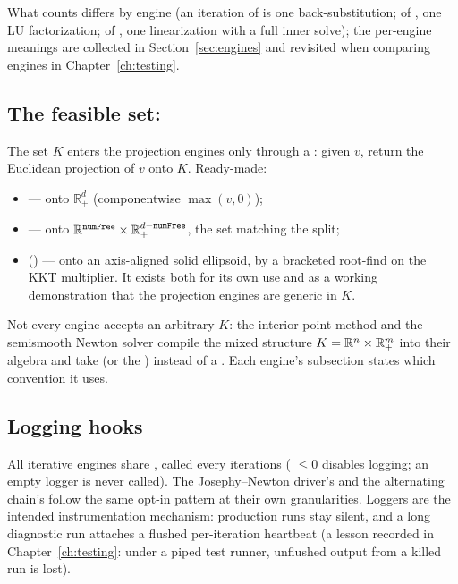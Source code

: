 What  counts differs by engine (an iteration of  is
one back-substitution; of , one LU factorization; of
, one linearization with a full inner solve); the per-engine
meanings are collected in Section~\ref{sec:engines} and revisited when
comparing engines in Chapter~\ref{ch:testing}.

\subsection{The feasible set: }

The set $K$ enters the projection engines only through a
: given $v$, return
the Euclidean projection of $v$ onto $K$. Ready-made:

\begin{itemize}
\item {} --- onto $\mathbb{R}^{d}_{+}$
  (componentwise $\max(v, 0)$);
\item {} --- onto
  $\mathbb{R}^{\texttt{numFree}} \times \mathbb{R}^{d-\texttt{numFree}}_{+}$,
  the set matching the  split;
\item {}
  () --- onto an axis-aligned solid ellipsoid,
  by a bracketed root-find on the KKT multiplier. It exists both for its own
  use and as a working demonstration that the projection engines are generic
  in $K$.
\end{itemize}

Not every engine accepts an arbitrary $K$: the interior-point method and the
semismooth Newton solver compile the mixed structure
$K = \mathbb{R}^{n} \times \mathbb{R}^{m}_{+}$ into their algebra and take  (or the )
instead of a . Each engine's subsection states which
convention it uses.

\subsection{Logging hooks}

All iterative engines share
, called every  iterations (
$\le 0$ disables logging; an empty logger is never called). The
Josephy--Newton driver's  and the alternating chain's
 follow the same opt-in pattern at their own
granularities. Loggers are the intended instrumentation mechanism:
production runs stay silent, and a long diagnostic run attaches a flushed
per-iteration heartbeat (a lesson recorded in Chapter~\ref{ch:testing}:
under a piped test runner, unflushed output from a killed run is lost).

